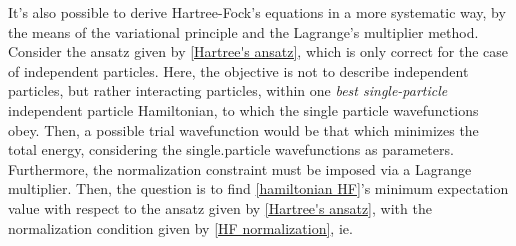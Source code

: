 \documentclass{homework}
\begin{document}
It's also possible to derive Hartree-Fock's equations in a more systematic way, by the means of the variational principle and the Lagrange's multiplier method. \\

Consider the ansatz given by \eqref{Hartree's ansatz}, which is only correct for the case of independent particles. Here, the objective is not to describe independent particles, but rather interacting particles, within one \textit{best single-particle} independent particle Hamiltonian, to which the single particle wavefunctions obey. Then, a possible trial wavefunction would be that which minimizes the total energy, considering the single.particle wavefunctions as parameters. Furthermore, the normalization constraint must be imposed via a Lagrange multiplier. Then, the question is to find \eqref{hamiltonian HF}'s minimum expectation value with respect to the ansatz given by \eqref{Hartree's ansatz}, with the normalization condition given by \eqref{HF normalization}, ie. 
\end{document}

